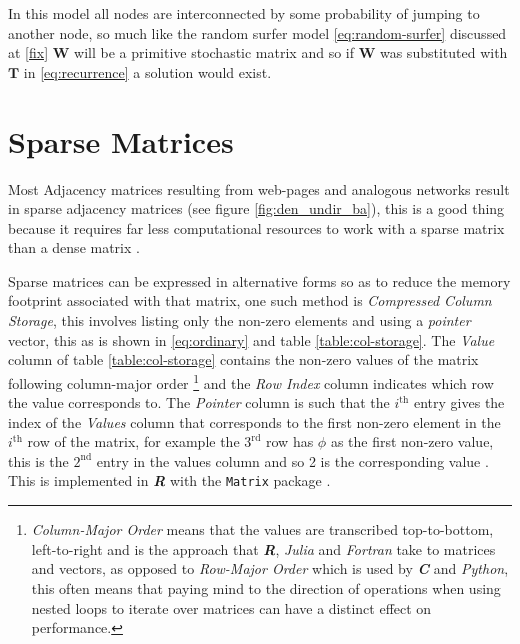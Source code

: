 \documentclass[11pt, twoside]{report}
\begin{document}
In this model all nodes are interconnected by some probability of jumping to
another node, so much like the random surfer model \eqref{eq:random-surfer} discussed
at \ref{fix} \(\mathbf{W}\) will be a primitive stochastic matrix and so if
\(\mathbf{W}\) was substituted with \(\mathbf{T}\) in \eqref{eq:recurrence} a solution
would exist.

\section{Sparse Matrices}
\label{sparse-matrix}
Most Adjacency matrices resulting from web-pages and analogous networks
result in sparse adjacency matrices (see figure \ref{fig:den_undir_ba}),
this is a good thing because it requires far less computational
resources to work with a sparse matrix than a dense matrix
 \cite[]{langvilleGooglePageRankScience2012} .



Sparse matrices can be expressed in alternative forms so as to reduce the memory
footprint associated with that matrix, one such method is \emph{Compressed Column
Storage}, this involves listing only the non-zero elements and using a \textit{pointer} vector, this as is shown in \eqref{eq:ordinary}
and table \ref{table:col-storage}. The \textit{Value} column of table \ref{table:col-storage} contains the non-zero values of the matrix following column-major order \footnote{\textit{Column-Major Order} means that the values are transcribed top-to-bottom, left-to-right and is the approach that \textit{\textbf{R}}, \textit{Julia} and \textit{Fortran} take to matrices and vectors, as opposed to \textit{Row-Major Order} which is used by \textbf{\textit{C}} and \textit{Python}, this often means that paying mind to the direction of operations when using nested loops to iterate over matrices can have a distinct effect on performance.} and the \textit{Row Index} column indicates which row the value corresponds to. The \textit{Pointer} column is such that the  \(i^{\mathrm{th}}\) entry gives the index of the \textit{Values} column that corresponds to the first non-zero element in the \(i^{\mathrm{th}}\) row of the matrix, for example the \(3^{\mathrm{rd}}\) row has \(\phi\) as the first non-zero value, this is the \(2^{\mathrm{nd}}\) entry in the values column and so 2 is the corresponding value \cite{IntelMathKernel}. This is implemented in \textbf{\emph{R}} with the \texttt{Matrix} package \cite{douglasbatesMatrixSparseDense2019}.
\end{document}
